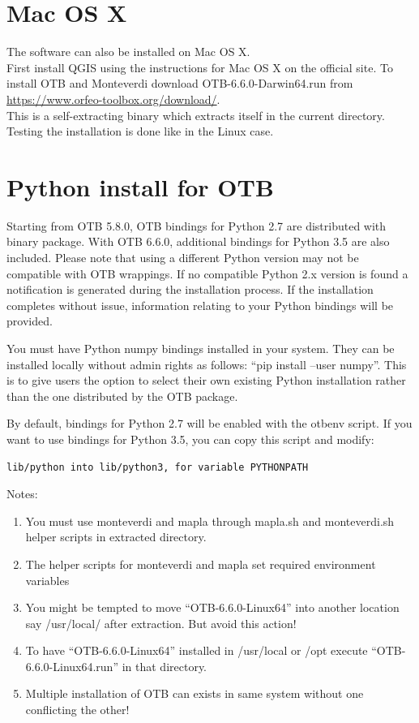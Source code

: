 \documentclass[10pt,a4paper]{article}
\begin{document}
\clearpage
\section{Mac OS X}

The software can also be installed on Mac OS X. \\

First install QGIS using the instructions for Mac OS X on the official site. To install OTB and  Monteverdi download 
OTB-6.6.0-Darwin64.run from \url{https://www.orfeo-toolbox.org/download/}. \\

This is a self-extracting binary which extracts itself in the current directory. Testing the installation is done like in the Linux case.

\clearpage
\section{Python install for OTB}

Starting from OTB 5.8.0, OTB bindings for Python 2.7 are distributed with binary
package. With OTB 6.6.0, additional bindings for Python 3.5 are also
included. Please note that using a different Python version may not be
compatible with OTB wrappings. If no compatible Python 2.x version is found a
notification is generated during the installation process. If the installation
completes without issue, information relating to your Python bindings will be
provided.

You must have Python numpy bindings installed in your system. They can be
installed locally without admin rights as follows: “pip install –user
numpy”. This is to give users the option to select their own existing Python
installation rather than the one distributed by the OTB package.

By default, bindings for Python 2.7 will be enabled with the otbenv script. If
you want to use bindings for Python 3.5, you can copy this script and modify:
\begin{verbatim}
lib/python into lib/python3, for variable PYTHONPATH
\end{verbatim}

Notes:
\begin{enumerate}

\item You must use monteverdi and mapla through mapla.sh and monteverdi.sh helper scripts in extracted directory.
\item The helper scripts for monteverdi and mapla set required environment variables
\item You might be tempted to move “OTB-6.6.0-Linux64” into another location say /usr/local/ after extraction. But avoid this action!
\item To have “OTB-6.6.0-Linux64” installed in /usr/local or /opt execute “OTB-6.6.0-Linux64.run” in that directory.
\item Multiple installation of OTB can exists in same system without one conflicting the other!

\end{enumerate}
\end{document}
